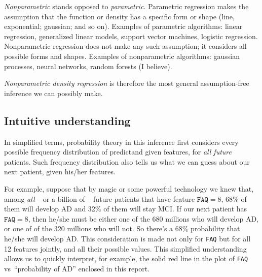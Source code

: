 \documentclass[\ifafour a4paper,12pt,\else a5paper,10pt,\fi%
onecolumn,oneside,article,%
british%
]{memoir}
\theoremstyle{remark}
\theoremstyle{innote}
\renewcommand*{\|}[1][]{\nonscript\:#1\vert\nonscript\:\mathopen{}}
\newcommand*{\vs}{{vs}}
\begin{document}
\emph{Nonparametric} stands opposed to \emph{parametric}. Parametric
regression makes the assumption that the function or density has a specific
form or shape (line, exponential; gaussian; and so on). Examples of
parametric algorithms: linear regression, generalized linear models,
support vector machines, logistic regression. Nonparametric regression does
not make any such assumption; it considers all possible forms and shapes.
Examples of nonparametric algorithms: gaussian processes, neural networks,
random forests (I believe).

\emph{Nonparametric density regression} is therefore the most general
assumption-free inference we can possibly make.

\subsection{Intuitive understanding}
\label{sec:understand}

In simplified terms, probability theory in this inference first considers
every possible frequency distribution of predictand given features, for
\emph{all future} patients. Such frequency distribution also tells us what
we can guess about our next patient, given his/her features.

For example, suppose that by magic or some powerful technology we knew
that, among \emph{all} -- or a billion of -- future patients that have
feature $\texttt{FAQ}=8$, 68\% of them will develop AD and 32\% of them
will stay MCI. If our next patient has $\texttt{FAQ}=8$, then he/she must
be either one of the 680 millions who will develop AD, or one of of the 320
millions who will not. So there's a 68\% probability that he/she will
develop AD. This consideration is made not only for \texttt{FAQ} but for
all 12 features jointly, and all their possible values. This simplified
understanding allows us to quickly interpret, for example, the solid red
line in the plot of \texttt{FAQ} \vs\ \enquote{probability of AD} enclosed
in this report.

\smallskip
\end{document}
